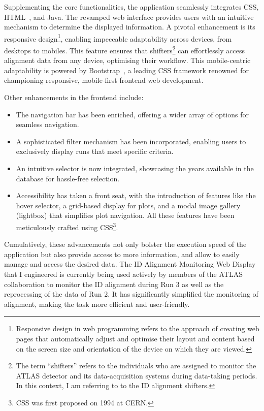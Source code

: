 Supplementing the core functionalities, the application seamlessly integrates 
CSS, HTML~\cite{Berners-Lee:2639699}, and Java.  %
The revamped web interface provides users with an intuitive mechanism to determine the displayed information. 
A pivotal enhancement is its responsive design\footnote{Responsive design in web programming refers to the 
approach of creating web pages that automatically adjust and optimise their layout and content based on the 
screen size and orientation of the device on which they are viewed.}, 
enabling impeccable adaptability across devices, from desktops to mobiles. 
This feature ensures that shifters\footnote{The term ``shifters''  refers to the individuals who are assigned to monitor 
the ATLAS detector and its data-acquisition systems during data-taking periods. In this context, I am referring to to 
the ID alignment shifters.} can effortlessly access alignment data from any device, optimising their workflow. 
This mobile-centric adaptability is powered by Bootstrap~\cite{EfroTibs93}, a leading CSS framework renowned for 
championing responsive, mobile-first frontend web development.

Other enhancements in the frontend include:
\begin{itemize}
	\item The navigation bar has been enriched, offering a wider array of options 
	for seamless navigation.
	\item A sophisticated filter mechanism has been incorporated, enabling users 
	to exclusively display runs that meet specific criteria.
	\item An intuitive selector is now integrated, showcasing the years available 
	in the database for hassle-free selection.
	\item Accessibility has taken a front seat, with the introduction of features like
	the hover selector, a grid-based display for plots, and a modal image gallery (lightbox) that simplifies plot navigation. All these features have been meticulously crafted using CSS\footnote{CSS was first proposed on 1994 at CERN.}. %
\end{itemize}

Cumulatively, these advancements not only bolster the execution speed of the application but also
provide access to more information, and allow to easily manage and access the desired data.  
The ID Alignment Monitoring Web Display that I engineered is currently being used actively by members of 
the ATLAS collaboration to monitor the ID alignment during Run 3 as well as the reprocessing of the data 
of Run 2. 
It has significantly simplified the monitoring of alignment, making the task 
more efficient and user-friendly. 

